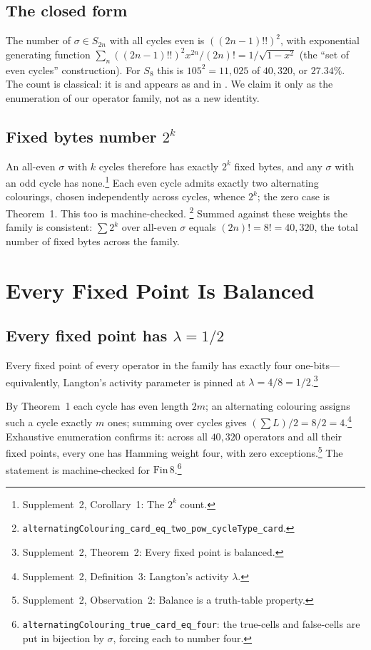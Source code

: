 \documentclass[man,12pt,floatsintext,donotrepeattitle]{apa7}
\newcommand{\sig}{\sigma}
\newcommand{\supptheorytext}[2]{Supplement~2, #1: #2.}
\newcommand{\supptheory}[2]{\footnote{\supptheorytext{#1}{#2}}}
\begin{document}
\subsection{The closed form}

The number of $\sig \in S_{2n}$ with all cycles even is $((2n-1)!!)^2$, with
exponential generating function $\sum_n ((2n-1)!!)^2 x^{2n}/(2n)! =
1/\sqrt{1-x^2}$ (the ``set of even cycles'' construction).
For $S_8$ this is $105^2 = 11{,}025$ of $40{,}320$, or $27.34\%$. The count
is classical: it is \textcite{oeis_a001818} and appears as
\textcite[Problem~5.34(c)]{stanley1999enumerative} and in
\textcite{riordan1968combinatorial}. We claim it only as the enumeration of
our operator family, not as a new identity.

\subsection{Fixed bytes number \texorpdfstring{$2^k$}{2 to the k}}

An all-even $\sig$ with $k$ cycles therefore has exactly $2^k$ fixed bytes, and any
$\sig$ with an odd cycle has none.\supptheory{Corollary~1}{The $2^k$ count}
Each even cycle admits exactly two alternating colourings, chosen independently
across cycles, whence $2^k$; the zero case is Theorem~1. This too
is machine-checked.%
\footnote{\texttt{alternatingColouring\_card\_eq\_two\_pow\_cycleType\_card}.}
Summed against these weights the family is consistent:
$\sum 2^{k}$ over all-even $\sig$ equals $(2n)! = 8! = 40{,}320$, the total
number of fixed bytes across the family.

\section{Every Fixed Point Is Balanced}
\label{sec:lambda}

\subsection{Every fixed point has \texorpdfstring{$\lambda = 1/2$}{lambda = 1/2}}

Every fixed point of every operator in the family has exactly four one-bits---equivalently,
Langton's activity parameter is pinned at $\lambda = 4/8 = 1/2$.\supptheory{Theorem~2}{Every fixed point is balanced}

\noindent By Theorem~1 each cycle has even length $2m$; an
alternating colouring assigns such a cycle exactly $m$ ones; summing over
cycles gives $(\sum L)/2 = 8/2 = 4$.\supptheory{Definition~3}{Langton's activity $\lambda$} Exhaustive enumeration confirms it:
across all $40{,}320$ operators and all their fixed points, every one has
Hamming weight four, with zero exceptions.\supptheory{Observation~2}{Balance is a truth-table property} The statement is machine-checked
for $\mathrm{Fin}\,8$.\footnote{%
\texttt{alternatingColouring\_true\_card\_eq\_four}: the true-cells and
false-cells are put in bijection by $\sig$, forcing each to number four.}
\end{document}
